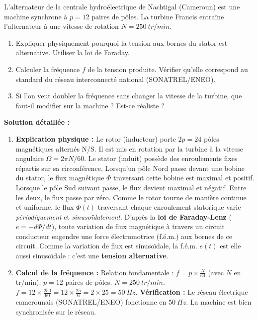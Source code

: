 \documentclass[11pt]{article}
\begin{document}
\begin{exoresolu}
L'alternateur de la centrale hydroélectrique de Nachtigal (Cameroun) est une machine synchrone à $p = 12$ paires de pôles. La turbine Francis entraîne l'alternateur à une vitesse de rotation $N = \SI{250}{tr/min}$.
\begin{enumerate}
    \item Expliquer physiquement pourquoi la tension aux bornes du stator est alternative. Utiliser la loi de Faraday.
    \item Calculer la fréquence $f$ de la tension produite. Vérifier qu'elle correspond au standard du réseau interconnecté national (SONATREL/ENEO).
    \item Si l'on veut doubler la fréquence sans changer la vitesse de la turbine, que faut-il modifier sur la machine ? Est-ce réaliste ?
\end{enumerate}
\tcblower
\textbf{Solution détaillée :}
\begin{enumerate}
    \item \textbf{Explication physique :}
    Le rotor (inducteur) porte $2p = 24$ pôles magnétiques alternés N/S. Il est mis en rotation par la turbine à la vitesse angulaire $\Omega = 2\pi N/60$.
    Le stator (induit) possède des enroulements fixes répartis sur sa circonférence.
    Lorsqu'un pôle Nord passe devant une bobine du stator, le flux magnétique $\Phi$ traversant cette bobine est maximal et positif. Lorsque le pôle Sud suivant passe, le flux devient maximal et négatif. Entre les deux, le flux passe par zéro.
    Comme le rotor tourne de manière continue et uniforme, le flux $\Phi(t)$ traversant chaque enroulement statorique varie \emph{périodiquement} et \emph{sinusoïdalement}.
    D'après la \textbf{loi de Faraday-Lenz} ($e = -d\Phi/dt$), toute variation de flux magnétique à travers un circuit conducteur engendre une force électromotrice (f.é.m.) aux bornes de ce circuit. Comme la variation de flux est sinusoïdale, la f.é.m. $e(t)$ est elle aussi sinusoïdale : c'est une \textbf{tension alternative}.
    
    \item \textbf{Calcul de la fréquence :}
    Relation fondamentale : $f = p \times \frac{N}{60}$ (avec $N$ en tr/min).
    $p = 12$ paires de pôles. $N = \SI{250}{tr/min}$.
    $f = 12 \times \frac{250}{60} = 12 \times \frac{25}{6} = 2 \times 25 = \SI{50}{Hz}$.
    \textbf{Vérification :} Le réseau électrique camerounais (SONATREL/ENEO) fonctionne en $\SI{50}{Hz}$. La machine est bien synchronisée sur le réseau.
    

\end{enumerate}
\end{exoresolu}
\end{document}
